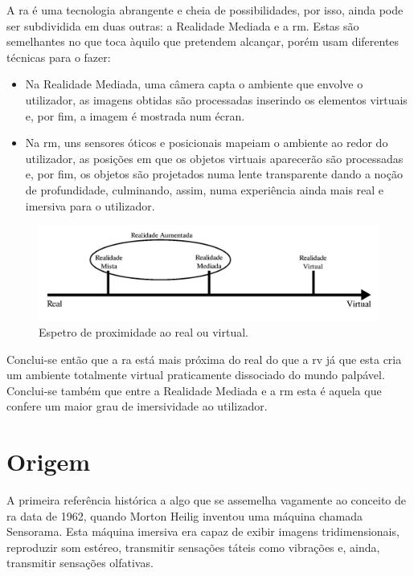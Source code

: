 \documentclass{report}
\begin{document}
A \ac{ra} é uma tecnologia abrangente e cheia de possibilidades, por isso, ainda pode ser subdividida em duas outras: a Realidade Mediada e a \ac{rm}. Estas são semelhantes no que toca àquilo que pretendem alcançar, porém usam diferentes técnicas para o fazer:
\begin{itemize}
    \item Na Realidade Mediada, uma câmera capta o ambiente que envolve o utilizador, as imagens obtidas são processadas inserindo os elementos virtuais e, por fim, a imagem é mostrada num écran.
    \item Na \ac{rm}, uns sensores óticos e posicionais mapeiam o ambiente ao redor do utilizador, as posições em que os objetos virtuais aparecerão são processadas e, por fim, os objetos são projetados numa lente transparente dando a noção de profundidade, culminando, assim, numa experiência ainda mais real e imersiva para o utilizador.
\end{itemize}

\begin{figure}[H]
    \centering
    \includegraphics[width=\textwidth]{spectre.png}
    \caption{Espetro de proximidade ao real ou virtual.}
    \label{Fig:spectre}
\end{figure}

Conclui-se então que a \ac{ra} está mais próxima do real do que a \ac{rv} já que esta cria um ambiente totalmente virtual praticamente dissociado do mundo palpável. Conclui-se também que entre a Realidade Mediada e a \ac{rm} esta é aquela que confere um maior grau de imersividade ao utilizador.

\section{Origem}
A primeira referência histórica a algo que se assemelha vagamente ao conceito de \ac{ra} data de 1962, quando Morton Heilig inventou uma máquina chamada Sensorama. Esta máquina imersiva era capaz de exibir imagens tridimensionais, reproduzir som estéreo, transmitir sensações táteis como vibrações e, ainda, transmitir sensações olfativas.\cite{sousa_ccg_2018}
\end{document}

